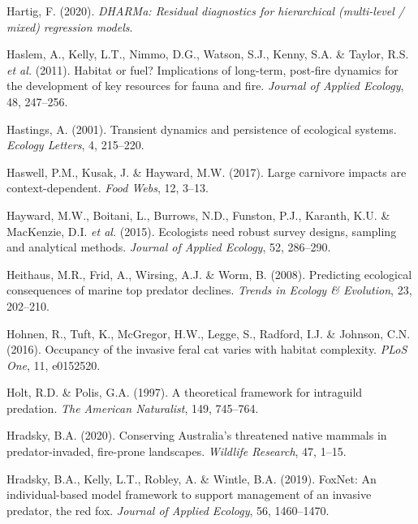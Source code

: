 \documentclass[11pt,a4paper,titlepage,twoside,openright]{style/unimelbthesis}
\begin{document}
\begin{mainmatter}
\leavevmode\hypertarget{ref-DHARMa}{}%
Hartig, F. (2020). \emph{DHARMa: Residual diagnostics for hierarchical (multi-level / mixed) regression models}.

\leavevmode\hypertarget{ref-haslem2011habitat}{}%
Haslem, A., Kelly, L.T., Nimmo, D.G., Watson, S.J., Kenny, S.A. \& Taylor, R.S. \emph{et al.} (2011). Habitat or fuel? Implications of long-term, post-fire dynamics for the development of key resources for fauna and fire. \emph{Journal of Applied Ecology}, 48, 247--256.

\leavevmode\hypertarget{ref-hastings2001transient}{}%
Hastings, A. (2001). Transient dynamics and persistence of ecological systems. \emph{Ecology Letters}, 4, 215--220.

\leavevmode\hypertarget{ref-haswell2017large}{}%
Haswell, P.M., Kusak, J. \& Hayward, M.W. (2017). Large carnivore impacts are context-dependent. \emph{Food Webs}, 12, 3--13.

\leavevmode\hypertarget{ref-hayward2015ecologists}{}%
Hayward, M.W., Boitani, L., Burrows, N.D., Funston, P.J., Karanth, K.U. \& MacKenzie, D.I. \emph{et al.} (2015). Ecologists need robust survey designs, sampling and analytical methods. \emph{Journal of Applied Ecology}, 52, 286--290.

\leavevmode\hypertarget{ref-heithaus2008predicting}{}%
Heithaus, M.R., Frid, A., Wirsing, A.J. \& Worm, B. (2008). Predicting ecological consequences of marine top predator declines. \emph{Trends in Ecology \& Evolution}, 23, 202--210.

\leavevmode\hypertarget{ref-hohnen2016occupancy}{}%
Hohnen, R., Tuft, K., McGregor, H.W., Legge, S., Radford, I.J. \& Johnson, C.N. (2016). Occupancy of the invasive feral cat varies with habitat complexity. \emph{PLoS One}, 11, e0152520.

\leavevmode\hypertarget{ref-holt1997theoretical}{}%
Holt, R.D. \& Polis, G.A. (1997). A theoretical framework for intraguild predation. \emph{The American Naturalist}, 149, 745--764.

\leavevmode\hypertarget{ref-hradsky2020conserving}{}%
Hradsky, B.A. (2020). Conserving Australia's threatened native mammals in predator-invaded, fire-prone landscapes. \emph{Wildlife Research}, 47, 1--15.

\leavevmode\hypertarget{ref-hradsky2019foxnet}{}%
Hradsky, B.A., Kelly, L.T., Robley, A. \& Wintle, B.A. (2019). FoxNet: An individual-based model framework to support management of an invasive predator, the red fox. \emph{Journal of Applied Ecology}, 56, 1460--1470.


\end{mainmatter}
\end{document}
